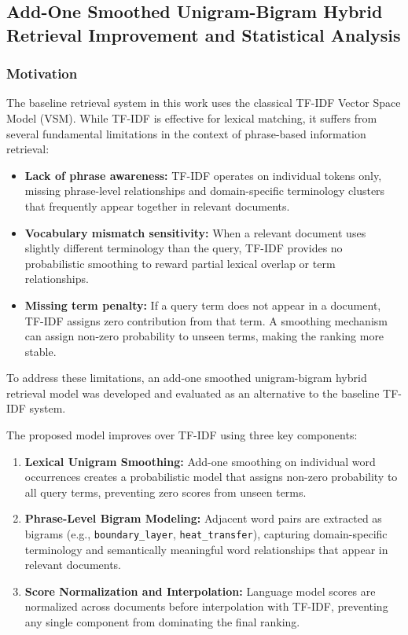 \subsection{Add-One Smoothed Unigram-Bigram Hybrid Retrieval Improvement and Statistical Analysis}

\subsubsection{Motivation}

The baseline retrieval system in this work uses the classical TF-IDF Vector Space Model (VSM). 
While TF-IDF is effective for lexical matching, it suffers from several fundamental limitations in the context of phrase-based information retrieval:

\begin{itemize}
    \item \textbf{Lack of phrase awareness:} TF-IDF operates on individual tokens only, missing phrase-level relationships and domain-specific terminology clusters that frequently appear together in relevant documents.
    
    \item \textbf{Vocabulary mismatch sensitivity:} When a relevant document uses slightly different terminology than the query, TF-IDF provides no probabilistic smoothing to reward partial lexical overlap or term relationships.
    
    \item \textbf{Missing term penalty:} If a query term does not appear in a document, TF-IDF assigns zero contribution from that term. A smoothing mechanism can assign non-zero probability to unseen terms, making the ranking more stable.
\end{itemize}

To address these limitations, an add-one smoothed unigram-bigram hybrid retrieval model was developed and evaluated as an alternative to the baseline TF-IDF system.

\vspace{0.2cm}

The proposed model improves over TF-IDF using three key components:

\begin{enumerate}
    \item \textbf{Lexical Unigram Smoothing:}
    Add-one smoothing on individual word occurrences creates a probabilistic model that assigns non-zero probability to all query terms, preventing zero scores from unseen terms.
    
    \item \textbf{Phrase-Level Bigram Modeling:}
    Adjacent word pairs are extracted as bigrams (e.g., \texttt{boundary\_layer}, \texttt{heat\_transfer}), capturing domain-specific terminology and semantically meaningful word relationships that appear in relevant documents.
    
    \item \textbf{Score Normalization and Interpolation:}
    Language model scores are normalized across documents before interpolation with TF-IDF, preventing any single component from dominating the final ranking.
\end{enumerate}

